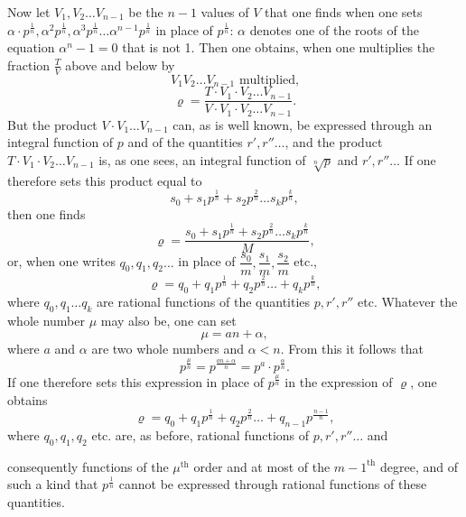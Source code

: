 \documentclass{article}
\begin{document}
Now let $V_1, V_2 \ldots V_{n-1}$ be the $n - 1$ values of $V$ that one finds when one sets $\alpha \cdot p^{\frac{1}{n}}, \alpha^{2} p^{\frac{1}{n}}, \alpha^{3} p^{\frac{1}{n}} \ldots \alpha^{n-1} p^{\frac{1}{n}}$ in place of $p^{\frac{1}{n}}$: $\alpha$ denotes one of the roots of the equation $\alpha^{n} - 1 = 0$ that is not 1. Then one obtains, when one multiplies the fraction $\frac{T}{V}$ above and below by
\[ V_1 V_2 \ldots V_{n-1} \text{ multiplied,} \]
\[ \varrho = \frac{T \cdot V_1 \cdot V_2 \ldots V_{n-1}}{V \cdot V_1 \cdot V_2 \ldots V_{n-1}}. \]
But the product $V \cdot V_1 \ldots V_{n-1}$ can, as is well known, be expressed through an integral function of $p$ and of the quantities $r', r'' \ldots$, and the product $T \cdot V_1 \cdot V_2 \ldots V_{n-1}$ is, as one sees, an integral function of $\sqrt[n]{p}$ and $r', r'' \ldots$ If one therefore sets this product equal to
\[ s_0 + s_1 p^{\frac{1}{n}} + s_2 p^{\frac{2}{n}} \ldots s_k p^{\frac{k}{n}}, \]
then one finds
\[ \varrho = \frac{s_0 + s_1 p^{\frac{1}{n}} + s_2 p^{\frac{2}{n}} \ldots s_k p^{\frac{k}{n}}}{M}, \]
or, when one writes $q_0, q_1, q_2 \ldots$ in place of $\dfrac{s_0}{m}, \dfrac{s_1}{m}, \dfrac{s_2}{m}$ etc.,
\[ \varrho = q_0 + q_1 p^{\frac{1}{n}} + q_2 p^{\frac{2}{n}} \ldots + q_k p^{\frac{k}{n}}, \]
where $q_0, q_1 \ldots q_k$ are rational functions of the quantities $p, r', r'' $ etc. Whatever the whole number $\mu$ may also be, one can set
\[ \mu = an + \alpha, \]
where $a$ and $\alpha$ are two whole numbers and $\alpha < n$. From this it follows that
\[ p^{\frac{\mu}{n}} = p^{\frac{an + \alpha}{n}} = p^{a} \cdot p^{\frac{\alpha}{n}}. \]
If one therefore sets this expression in place of $p^{\frac{\mu}{n}}$ in the expression of $\varrho$, one obtains
\[ \varrho = q_0 + q_1 p^{\frac{1}{n}} + q_2 p^{\frac{2}{n}} \ldots + q_{n-1} p^{\frac{n-1}{n}}, \]
where $q_0, q_1, q_2$ etc. are, as before, rational functions of $p, r', r'' \ldots$ and

consequently functions of the $\mu^{\text{th}}$ order and at most of the $m - 1^{\text{th}}$ degree, and of such a kind that $p^{\frac{1}{n}}$ cannot be expressed through rational functions of these quantities.
\end{document}
